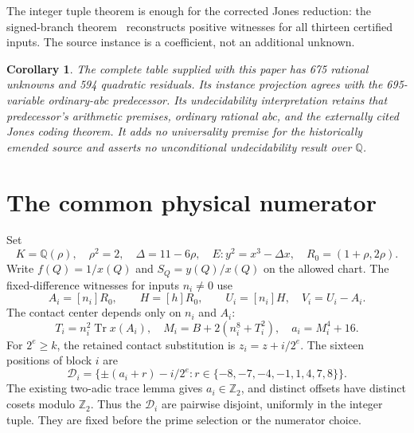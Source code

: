 \documentclass[11pt]{article}
\newtheorem{corollary}[theorem]{Corollary}
\newcommand{\Q}{\mathbb Q}\newcommand{\Z}{\mathbb Z}
\newcommand{\Tr}{\operatorname{Tr}}\newcommand{\Nm}{\operatorname{N}}
\begin{document}
The integer tuple theorem is enough for the corrected Jones reduction:
the signed-branch theorem~\cite{signed} reconstructs positive witnesses
for all thirteen certified inputs. The source instance is a coefficient,
not an additional unknown.

\begin{corollary}\label{cor:675}
The complete table supplied with this paper has 675 rational unknowns
and 594 quadratic residuals. Its instance projection agrees with the
695-variable ordinary-abc predecessor. Its undecidability interpretation
retains that predecessor's arithmetic premises, ordinary rational abc,
and the externally cited Jones coding theorem. It adds no universality
premise for the historically emended source and asserts no unconditional
undecidability result over $\Q$.
\end{corollary}

\section{The common physical numerator}

Set
\[
 K=\Q(\rho),\quad \rho^2=2,\quad \Delta=11-6\rho,\quad
 E:y^2=x^3-\Delta x,\quad R_0=(1+\rho,2\rho).
\]
Write $f(Q)=1/x(Q)$ and $S_Q=y(Q)/x(Q)$ on the allowed chart.
The fixed-difference witnesses for inputs $n_i\ne0$ use
\[
 A_i=[n_i]R_0,\qquad H=[h]R_0,\qquad
 U_i=[n_i]H,\quad V_i=U_i-A_i.
\]
The contact center depends only on $n_i$ and $A_i$:
\[
 T_i=n_i^2\Tr x(A_i),\quad
 M_i=B+2(n_i^8+T_i^2),\quad a_i=M_i^4+16.
\]
For $2^e\ge k$, the retained contact substitution is
$z_i=z+i/2^e$. The sixteen positions of block $i$ are
\[
 \mathcal D_i=\{\pm(a_i+r)-i/2^e:
                    r\in\{-8,-7,-4,-1,1,4,7,8\}\}.
\]
The existing two-adic trace lemma gives $a_i\in\Z_2$, and distinct
offsets have distinct cosets modulo $\Z_2$. Thus the $\mathcal D_i$
are pairwise disjoint, uniformly in the integer tuple. They are fixed
before the prime selection or the numerator choice.
\end{document}
